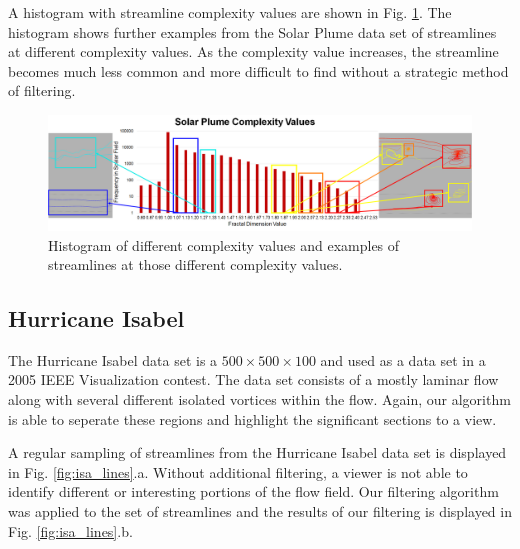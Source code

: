 \documentclass[journal]{vgtc}                %
\begin{document}
A histogram with streamline complexity values are shown in Fig. \ref{fig:histogram}.
The histogram shows further examples from the Solar Plume data set of streamlines at different complexity values.
As the complexity value increases, the streamline becomes much less common and more difficult to find without a strategic method of filtering.

\begin{figure}[t]
	\centering
		\begin{minipage}{0.99\linewidth}
			\centering \small
			\includegraphics[height = .27\linewidth]{Images/histogram.png}
		\end{minipage}
	\caption{Histogram of different complexity values and examples of streamlines at those different complexity values.}
	\label{fig:histogram}
\end{figure}

\subsection{Hurricane Isabel}

The Hurricane Isabel data set is a $500 \times 500 \times 100$ and used as a data set in a 2005 IEEE Visualization contest.
The data set consists of a mostly laminar flow along with several different isolated vortices within the flow.
Again, our algorithm is able to seperate these regions and highlight the significant sections to a view.

A regular sampling of streamlines from the Hurricane Isabel data set is displayed in Fig. \ref{fig:isa_lines}.a.
Without additional filtering, a viewer is not able to identify different or interesting portions of the flow field.
Our filtering algorithm was applied to the set of streamlines and the results of our filtering is displayed in Fig. \ref{fig:isa_lines}.b.
\end{document}
